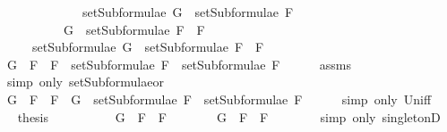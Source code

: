 \begin{isabellebody}
\ \ \ \ \ \ \ \ \ \ \ \ {\isasymLongrightarrow}\ setSubformulae\ G\ {\isasymsubseteq}\ setSubformulae\ F{}{\isachardoublequoteclose}\isanewline
\ \ \ \ \ \ \ \ \ \ {\isachardoublequoteopen}G\ {\isasymin}\ setSubformulae\ {\isacharparenleft}F{}\ \isactrlbold {\isasymor}\ F{}{\isacharparenright}{\isachardoublequoteclose}\isanewline
\ \ \ \ \ {\isachardoublequoteopen}setSubformulae\ G\ {\isasymsubseteq}\ setSubformulae\ {\isacharparenleft}F{}\ \isactrlbold {\isasymor}\ F{}{\isacharparenright}{\isachardoublequoteclose}\isanewline
%
\isadelimproof
%
\endisadelimproof
%
\isatagproof
{}\isamarkupfalse%
\ {\isacharminus}\isanewline
\ \ \isamarkupfalse%
\ {\isachardoublequoteopen}G\ {\isasymin}\ {\isacharbraceleft}F{}\ \isactrlbold {\isasymor}\ F{}{\isacharbraceright}\ {\isasymunion}\ {\isacharparenleft}setSubformulae\ F{}\ {\isasymunion}\ setSubformulae\ F{}{\isacharparenright}{\isachardoublequoteclose}\isanewline
\ \ \ \ \isamarkupfalse%
\ assms{\isacharparenleft}{}{\isacharparenright}\ \isanewline
\ \ \ \ \isamarkupfalse%
\ {\isacharparenleft}simp\ only{\isacharcolon}\ setSubformulae{\isacharunderscore}or{\isacharparenright}\isanewline
\ \ \isamarkupfalse%
\ \isamarkupfalse%
\ {\isachardoublequoteopen}G\ {\isasymin}\ {\isacharbraceleft}F{}\ \isactrlbold {\isasymor}\ F{}{\isacharbraceright}\ {\isasymor}\ G\ {\isasymin}\ setSubformulae\ F{}\ {\isasymunion}\ setSubformulae\ F{}{\isachardoublequoteclose}\isanewline
\ \ \ \ \isamarkupfalse%
\ {\isacharparenleft}simp\ only{\isacharcolon}\ Un{\isacharunderscore}iff{\isacharparenright}\isanewline
\ \ \isamarkupfalse%
\ \isamarkupfalse%
\ {\isacharquery}thesis\isanewline
\ \ \isamarkupfalse%
\ \isanewline
\ \ \ \ \isamarkupfalse%
\ {\isachardoublequoteopen}G\ {\isasymin}\ {\isacharbraceleft}F{}\ \isactrlbold {\isasymor}\ F{}{\isacharbraceright}{\isachardoublequoteclose}\isanewline
\ \ \ \ \isamarkupfalse%
\ \isamarkupfalse%
\ {\isachardoublequoteopen}G\ {\isacharequal}\ F{}\ \isactrlbold {\isasymor}\ F{}{\isachardoublequoteclose}\isanewline
\ \ \ \ \ \ \isamarkupfalse%
\ {\isacharparenleft}simp\ only{\isacharcolon}\ singletonD{\isacharparenright}\isanewline
\ \ \ \ \isamarkupfalse%

\end{isabellebody}
